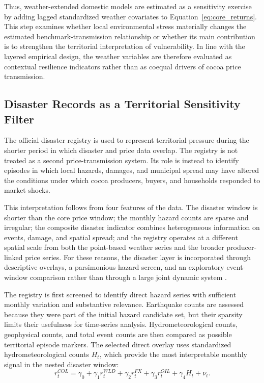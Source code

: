 \documentclass[11pt]{article}
\begin{document}
Thus, weather-extended domestic models are estimated as a sensitivity exercise by adding lagged standardized weather covariates to Equation~\ref{eq:core_returns}. This step examines whether local environmental stress materially changes the estimated benchmark-transmission relationship or whether its main contribution is to strengthen the territorial interpretation of vulnerability. In line with the layered empirical design, the weather variables are therefore evaluated as contextual resilience indicators rather than as coequal drivers of cocoa price transmission.

\subsection{Disaster Records as a Territorial Sensitivity Filter}

The official disaster registry is used to represent territorial pressure during the shorter period in which disaster and price data overlap. The registry is not treated as a second price-transmission system. Its role is instead to identify episodes in which local hazards, damages, and municipal spread may have altered the conditions under which cocoa producers, buyers, and households responded to market shocks.

This interpretation follows from four features of the data. The disaster window is shorter than the core price window; the monthly hazard counts are sparse and irregular; the composite disaster indicator combines heterogeneous information on events, damage, and spatial spread; and the registry operates at a different spatial scale from both the point-based weather series and the broader producer-linked price series. For these reasons, the disaster layer is incorporated through descriptive overlays, a parsimonious hazard screen, and an exploratory event-window comparison rather than through a large joint dynamic system \citep{hakkio_rush_1991,lutkepohl_2005,acosta_ihle_voncramon_2019,Parsons2021,Garschagen2021}.

The registry is first screened to identify direct hazard series with sufficient monthly variation and substantive relevance. Earthquake counts are assessed because they were part of the initial hazard candidate set, but their sparsity limits their usefulness for time-series analysis. Hydrometeorological counts, geophysical counts, and total event counts are then compared as possible territorial episode markers. The selected direct overlay uses standardized hydrometeorological counts $H_t$, which provide the most interpretable monthly signal in the nested disaster window:
\begin{equation}
r^{COL}_{t} = \gamma_0 + \gamma_1 r^{WLD}_{t} + \gamma_2 r^{FX}_{t} + \gamma_3 r^{OIL}_{t} + \gamma_4 H_t + \nu_t.
\label{eq:hazard_return_overlay}
\end{equation}
\end{document}
